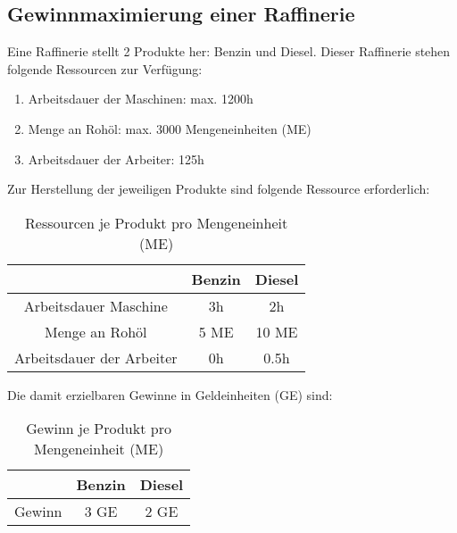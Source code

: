 \documentclass{eegreport}
\begin{document}
\setcounter{section}{2}

\mytitlepage
{} 
\tableofcontents 
{} 

\newpage

\subsection{Gewinnmaximierung einer Raffinerie}
Eine Raffinerie stellt 2 Produkte her: Benzin und Diesel. Dieser Raffinerie stehen folgende Ressourcen zur Verfügung:

\begin{enumerate}
\item Arbeitsdauer der Maschinen: max. 1200h
\item Menge an Rohöl: max. 3000 Mengeneinheiten (ME)
\item Arbeitsdauer der Arbeiter: 125h
\end{enumerate}

Zur Herstellung der jeweiligen Produkte sind folgende Ressource erforderlich:

\begin{table}[h]
\begin{center}
\begin{tabular}{|c|c|c|}
\hline 
 & Benzin & Diesel \\ 
\hline 
Arbeitsdauer Maschine & 3h & 2h \\ 
\hline 
Menge an Rohöl & 5 ME & 10 ME \\ 
\hline 
Arbeitsdauer der Arbeiter & 0h & 0.5h \\ 
\hline 
\end{tabular} 
\end{center}
\caption{Ressourcen je Produkt pro Mengeneinheit (ME)}
\label{Ressourcen_Produkt}
\end{table}

Die damit erzielbaren Gewinne in Geldeinheiten (GE) sind:

\begin{table}[h]
\begin{center}
\begin{tabular}{|c|c|c|}
\hline 
 & Benzin & Diesel \\ 
\hline 
Gewinn & 3 GE & 2 GE \\ 
\hline 
\end{tabular} 
\end{center}
\caption{Gewinn je Produkt pro Mengeneinheit (ME)}
\label{Gewinn_Produkt}
\end{table}
\end{document}
